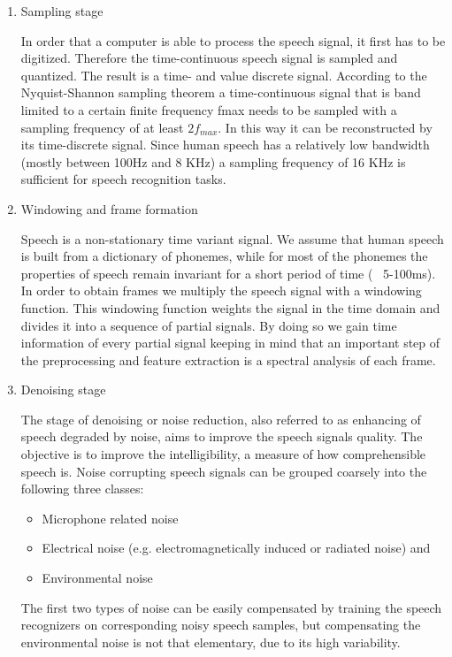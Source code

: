 \begin{enumerate}
	\item Sampling stage
	
	
	In order that a computer is able to process the speech signal, it first has to be digitized. Therefore the time-continuous speech signal is sampled and quantized. The result is a time- and value discrete signal. According to the Nyquist-Shannon sampling theorem a time-continuous signal that is band limited to a certain finite frequency fmax needs to be sampled with a sampling frequency of at least $2f_{max}$. In this way it can be reconstructed by its time-discrete signal. Since human speech has a relatively low bandwidth (mostly between 100Hz and 8 KHz) a sampling frequency of 16 KHz is sufficient for speech recognition tasks. 
	
	\item Windowing and frame formation 
	
	
	Speech is a non-stationary time variant signal. We assume that human speech is built from a dictionary of phonemes, while for most of the phonemes the properties of speech remain invariant for a short period of time (~ 5-100ms). In order to obtain frames we multiply the speech signal with a windowing function. This windowing function weights the signal in the time domain and divides it into a sequence of partial signals. By doing so we gain time information of every partial signal keeping in mind that an important step of the preprocessing and feature extraction is a spectral analysis of each frame. 
	\item Denoising stage
	
	
	The stage of denoising or noise reduction, also referred to as enhancing of speech degraded by noise, aims to improve the speech signals quality. The objective is to improve the intelligibility, a measure of how comprehensible speech is. Noise corrupting speech signals can be grouped coarsely into the following three classes: 
	\begin{itemize}
		\item Microphone related noise 
		\item Electrical noise (e.g. electromagnetically induced or radiated noise) and
		\item Environmental noise
	\end{itemize}
	The first two types of noise can be easily compensated by training the speech recognizers on corresponding noisy speech samples, but compensating the environmental noise is not that elementary, due to its high variability. 
	

\end{enumerate}

